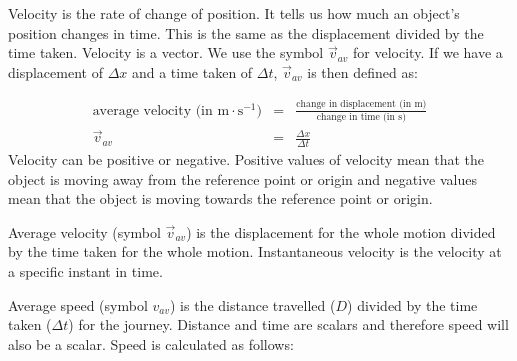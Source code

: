       \label{m38791*id64258}Velocity is the rate of change of position. It tells us how much an object's position changes in time. This is the same as the displacement divided by the time taken. Velocity is a vector. We use the symbol $\vec{v}_{av}$ for velocity. If we have a displacement of $\Delta x$ and a time taken of $\Delta t$, $\vec{v}_{av}$ is then defined as:\par 
      \label{m38791*id64307}\nopagebreak\noindent{}
\begin{eqnarray*}
\text{average velocity (in m} \cdot \text{s}^{-1}) &=& \frac{\text{change in displacement (in m)}}{\text{change in time (in s)}}\\
\vec{v}_{av} &=& \frac{\Delta x}{\Delta t}
\end{eqnarray*}\label{eq:pr:velocity}
      \label{m38791*id64460}Velocity can be positive or negative. Positive values of velocity mean that the object is moving away from the reference point or origin and negative values mean that the object is moving towards the reference point or origin.\par 
\label{m38791*notfhsst!!!underscore!!!id615}
      \label{m38791*id64500}Average velocity (symbol $\vec{v}_{av}$) is the displacement for the whole motion divided by the time taken for the whole motion. Instantaneous velocity is the velocity at a specific instant in time.\par 
\label{m38791*id64514}Average speed (symbol $v_{av}$) is the distance travelled ($D$) divided by the time taken ($\Delta t$) for the journey. Distance and time are scalars and therefore speed will also be a scalar. Speed is calculated as follows:\par 
      \label{m38791*id64549}\nopagebreak\noindent{}
        
